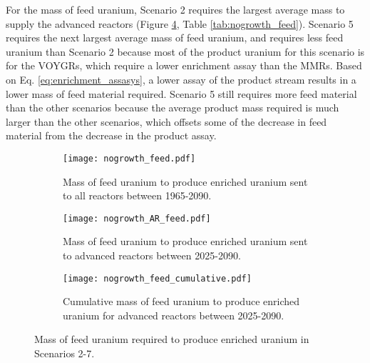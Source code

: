 For the mass of feed uranium, Scenario 2 requires the largest average mass 
to supply the advanced reactors (Figure \ref{fig:nogrowth_feed}, Table 
\ref{tab:nogrowth_feed}). Scenario 5 requires the next largest average 
mass of feed uranium, and requires less feed uranium than Scenario 2 because 
most of the product uranium for this scenario is for the VOYGRs, which 
require a lower enrichment assay than the \glspl{MMR}. Based on Eq. 
\ref{eq:enrichment_assasys}, a lower assay of the product stream results in 
a lower mass of feed material required. Scenario 5 still requires more feed 
material than the other scenarios because the average product mass required 
is much larger than the other scenarios, which offsets some of the decrease 
in feed material from the decrease in the product assay. 

\begin{figure}
    \centering
    \begin{subfigure}[b]{0.45\textwidth}
        \centering
        \texttt{[image: nogrowth\_feed.pdf]}
        \caption{Mass of feed uranium to produce enriched uranium sent to 
        all reactors between 1965-2090.}
        \label{fig:nogrowth_all_feed}
    \end{subfigure}
    \hfill
    \begin{subfigure}[b]{0.45\textwidth}
        \centering
        \texttt{[image: nogrowth\_AR\_feed.pdf]}
        \caption{Mass of feed uranium to produce enriched uranium sent to 
        advanced reactors between 2025-2090.}
        \label{fig:nogrowth_AR_feed}
    \end{subfigure}
    \begin{subfigure}[b]{0.45\textwidth}
        \centering
        \texttt{[image: nogrowth\_feed\_cumulative.pdf]}
        \caption{Cumulative mass of feed uranium to produce enriched 
        uranium for advanced reactors between 2025-2090.}
        \label{fig:nogrowth_feed_cumulative}
    \end{subfigure}
       \caption{Mass of feed uranium required to produce enriched uranium
        in Scenarios 2-7.}
       \label{fig:nogrowth_feed}
\end{figure}

